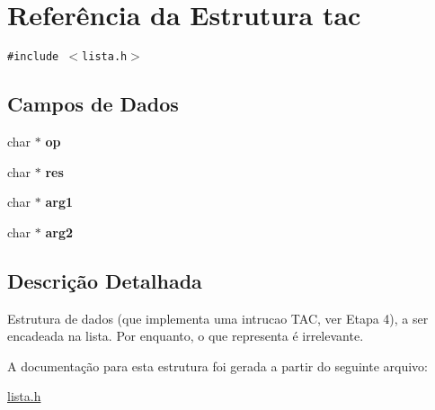 \hypertarget{structtac}{
\section{Referência da Estrutura tac}
\label{structtac}
}
{\tt \#include $<$lista.h$>$}

\subsection*{Campos de Dados}
\begin{CompactItemize}
\item 
\hypertarget{structtac_95f9c50b359afc15df11bdbf029651d7}{
char $\ast$ \textbf{op}}
\label{structtac_95f9c50b359afc15df11bdbf029651d7}

\item 
\hypertarget{structtac_b9916cad43f718ed7a316e94ce80bab1}{
char $\ast$ \textbf{res}}
\label{structtac_b9916cad43f718ed7a316e94ce80bab1}

\item 
\hypertarget{structtac_473f301b4f09061170fd4042cec395cf}{
char $\ast$ \textbf{arg1}}
\label{structtac_473f301b4f09061170fd4042cec395cf}

\item 
\hypertarget{structtac_6fb90118ff84ebfb171852afd4a31a37}{
char $\ast$ \textbf{arg2}}
\label{structtac_6fb90118ff84ebfb171852afd4a31a37}

\end{CompactItemize}


\subsection{Descrição Detalhada}
Estrutura de dados (que implementa uma intrucao TAC, ver Etapa 4), a ser encadeada na lista. Por enquanto, o que representa é irrelevante. 

A documentação para esta estrutura foi gerada a partir do seguinte arquivo:\begin{CompactItemize}
\item 
\hyperlink{lista_8h}{lista.h}\end{CompactItemize}
